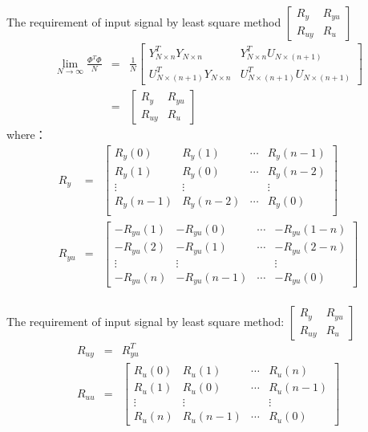 \begin{frame}{ The requirement of input signal by least square method $\begin{bmatrix}R_y & R_{yu} \\ R_{uy} & R_{u}\end{bmatrix}$}
\begin{eqnarray*}
\lim_{N\rightarrow\infty}\frac{\Phi^T\Phi}{N} &=& 
\frac{1}{N}
\begin{bmatrix}
Y_{N \times n}^T Y_{N\times n}  & Y_{N \times n}^T U_{N\times(n+1)}  \\
U_{N\times(n+1)}^T Y_{N\times n}  &  U_{N\times(n+1)}^T U_{N\times(n+1)} 
\end{bmatrix}\\
&=& \begin{bmatrix} R_y & R_{yu} \\ R_{uy} & R_u\end{bmatrix}
\end{eqnarray*}
where：
\begin{eqnarray*}
R_y &=& 
\begin{bmatrix}
R_y(0) & R_y(1) & \cdots & R_y(n-1) \\
R_y(1) & R_y(0) & \cdots & R_y(n-2) \\
\vdots & \vdots &        & \vdots   \\
R_y(n-1) & R_y(n-2) & \cdots & R_y(0) \\
\end{bmatrix}\\
R_{yu} &=&
\begin{bmatrix}
-R_{yu}(1) & -R_{yu}(0) & \cdots & -R_{yu}(1-n) \\
-R_{yu}(2) & -R_{yu}(1) & \cdots & -R_{yu}(2-n) \\
\vdots     & \vdots     &        &\vdots \\
-R_{yu}(n) & -R_{yu}(n-1) & \cdots & -R_{yu}(0) 
\end{bmatrix} \\
\end{eqnarray*}
\end{frame}

\begin{frame}{ The requirement of input signal by least square method: $\begin{bmatrix}R_y & R_{yu} \\ R_{uy} & R_{u}\end{bmatrix}$}
\begin{eqnarray*}
R_{uy} &=& R_{yu}^T \\
R_{uu} &=&
\begin{bmatrix}
R_u(0) & R_u(1) & \cdots & R_u(n) \\
R_u(1) & R_u(0) & \cdots & R_u(n-1) \\
\vdots     & \vdots     &        &\vdots \\
R_u(n) & R_u(n-1) & \cdots & R_u(0)
\end{bmatrix}
\end{eqnarray*}


\end{frame}

